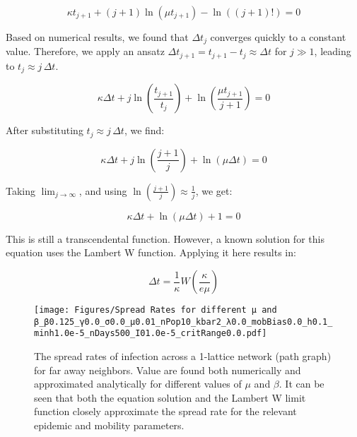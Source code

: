 \begin{equation}
\kappa t_{j+1} + (j+1) \ln(\mu t_{j+1}) - \ln((j+1)!) = 0 
\end{equation}

Based on numerical results, we found that ${\Delta t}_{j}$ converges quickly to a constant value. Therefore, we apply an ansatz ${\Delta t}_{j+1} = t_{j+1} - t_j \approx {\Delta t}$ for $j \gg 1$, leading to $t_j \approx j \, \Delta t$.

\begin{equation}
\kappa \Delta t + j \ln\left( \frac{t_{j+1}}{t_j} \right) + \ln\left( \frac{\mu t_{j+1}}{j+1} \right) = 0
\end{equation}

After substituting $t_j \approx j \, \Delta t$, we find:

\begin{equation}
\kappa \Delta t + j \ln\left( \frac{j+1}{j} \right) + \ln\left( \mu \Delta t \right) = 0 
\end{equation}

Taking $\lim_{j \to \infty}$, and using $\ln\left( \frac{{j+1}}{j} \right) \approx \frac{1}{j}$, we get:

\begin{equation}
\kappa \Delta t + \ln( \mu \Delta t ) + 1 = 0
\end{equation}

This is still a transcendental function. However, a known solution for this equation uses the Lambert W function. Applying it here results in:

\begin{equation}
\Delta t = \frac{1}{\kappa} W\left(\frac{\kappa}{e \mu}\right)
\label{eq: Lambert W approximation}
\end{equation}

\begin{figure}[!ht]
    \centering
    \texttt{[image: Figures/Spread Rates for different μ and β\_β0.125\_γ0.0\_σ0.0\_μ0.01\_nPop10\_kbar2\_λ0.0\_mobBias0.0\_h0.1\_minh1.0e-5\_nDays500\_I01.0e-5\_critRange0.0.pdf]}
    \caption{\small The spread rates of infection across a 1-lattice network (path graph) for far away neighbors. Value are found both numerically and approximated analytically for different values of $\mu$ and $\beta$. It can be seen that both the equation solution and the Lambert W limit function closely approximate the spread rate for the relevant epidemic and mobility parameters.}
    \label{Spread Rates mu beta}
\end{figure}

